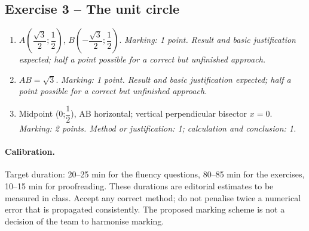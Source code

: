 \subsection*{Exercise 3 -- The unit circle}
\begin{enumerate}
\item $A(\dfrac{\sqrt 3}{2};\dfrac{1}{2})$, $B(-\dfrac{\sqrt 3}{2};\dfrac{1}{2})$. \textit{Marking: 1 point. Result and basic justification expected; half a point possible for a correct but unfinished approach.}
\item $AB=\sqrt3$. \textit{Marking: 1 point. Result and basic justification expected; half a point possible for a correct but unfinished approach.}
\item Midpoint (0;$\dfrac{1}{2}$), AB horizontal; vertical perpendicular bisector $x=0$. \textit{Marking: 2 points. Method or justification: 1; calculation and conclusion: 1.}
\end{enumerate}
\paragraph{Calibration.} Target duration: 20--25 min for the fluency questions, 80--85 min for the exercises, 10--15 min for proofreading. These durations are editorial estimates to be measured in class. Accept any correct method; do not penalise twice a numerical error that is propagated consistently. The proposed marking scheme is not a decision of the team to harmonise marking.
